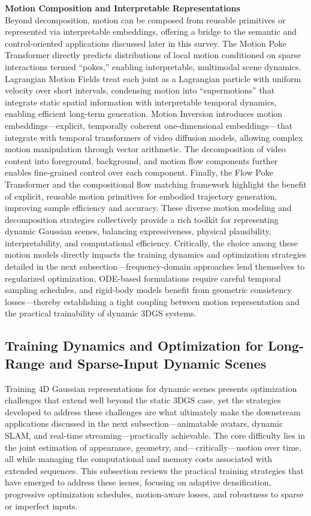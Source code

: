\documentclass[11pt]{article}
\begin{document}
\textbf{Motion Composition and Interpretable Representations}\\
Beyond decomposition, motion can be composed from reusable primitives or represented via interpretable embeddings, offering a bridge to the semantic and control-oriented applications discussed later in this survey. The Motion Poke Transformer \cite{ref368} directly predicts distributions of local motion conditioned on sparse interactions termed ``pokes,'' enabling interpretable, multimodal scene dynamics. Lagrangian Motion Fields \cite{ref369} treat each joint as a Lagrangian particle with uniform velocity over short intervals, condensing motion into ``supermotions'' that integrate static spatial information with interpretable temporal dynamics, enabling efficient long-term generation. Motion Inversion \cite{ref370} introduces motion embeddings---explicit, temporally coherent one-dimensional embeddings---that integrate with temporal transformers of video diffusion models, allowing complex motion manipulation through vector arithmetic. The decomposition of video content into foreground, background, and motion flow components \cite{ref371} further enables fine-grained control over each component. Finally, the Flow Poke Transformer \cite{ref368} and the compositional flow matching framework \cite{ref372} highlight the benefit of explicit, reusable motion primitives for embodied trajectory generation, improving sample efficiency and accuracy. These diverse motion modeling and decomposition strategies collectively provide a rich toolkit for representing dynamic Gaussian scenes, balancing expressiveness, physical plausibility, interpretability, and computational efficiency. Critically, the choice among these motion models directly impacts the training dynamics and optimization strategies detailed in the next subsection---frequency-domain approaches lend themselves to regularized optimization, ODE-based formulations require careful temporal sampling schedules, and rigid-body models benefit from geometric consistency losses---thereby establishing a tight coupling between motion representation and the practical trainability of dynamic 3DGS systems.

\subsection{Training Dynamics and Optimization for Long-Range and Sparse-Input Dynamic Scenes}

Training 4D Gaussian representations for dynamic scenes presents optimization challenges that extend well beyond the static 3DGS case, yet the strategies developed to address these challenges are what ultimately make the downstream applications discussed in the next subsection---animatable avatars, dynamic SLAM, and real-time streaming---practically achievable. The core difficulty lies in the joint estimation of appearance, geometry, and---critically---motion over time, all while managing the computational and memory costs associated with extended sequences. This subsection reviews the practical training strategies that have emerged to address these issues, focusing on adaptive densification, progressive optimization schedules, motion-aware losses, and robustness to sparse or imperfect inputs.
\end{document}
